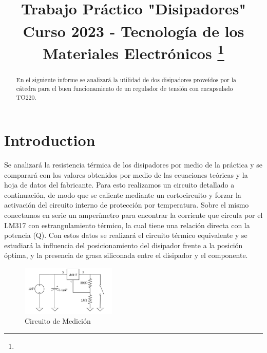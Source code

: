 \documentclass[conference]{IEEEtran}
\begin{document}
\title{Trabajo Práctico "Disipadores"\\
{\footnotesize \textsuperscript{}Curso 2023 - Tecnología de los Materiales Electrónicos}
\thanks{}
}

\author{
\and
{}
}

\maketitle


\begin{abstract}
En el siguiente informe se analizará la utilidad de dos disipadores proveídos por la cátedra
para el buen funcionamiento de un regulador de tensión con encapsulado TO220.
\end{abstract}

\section{Introduction}
Se analizará la resistencia térmica de los disipadores por medio de la práctica y se comparará con los valores 
obtenidos por medio de las ecuaciones teóricas y la hoja de datos del fabricante. Para esto realizamos un
circuito detallado a continuación, de modo que se caliente mediante un cortocircuito 
y forzar la activación del circuito interno de protección por temperatura. Sobre el mismo conectamos en 
serie un amperímetro para encontrar la corriente que circula por el LM317 con estrangulamiento térmico, la 
cual tiene una relación directa con la potencia (Q).
Con estos datos se realizará el circuito térmico equivalente y se estudiará la influencia del posicionamiento
del disipador frente a la posición óptima, y la presencia de grasa siliconada entre el disipador y el componente.
\begin{figure}[h]
    \centering
    \includegraphics[width=0.4\textwidth]{CircuitoDeMedicion.png}
    \caption{Circuito de Medición}
\end{figure}
\end{document}
